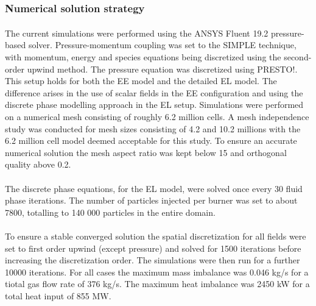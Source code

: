 \documentclass{webofc}
\begin{document}
\subsubsection{Numerical solution strategy}
The current simulations were performed using the ANSYS Fluent\textsuperscript{\textregistered} 19.2 pressure-based solver. Pressure-momentum coupling was set to the SIMPLE technique, with momentum, energy and species equations being discretized using the second-order upwind method. The pressure equation was discretized using PRESTO!. This setup holds for both the EE model and the detailed EL model. The difference arises in the use of scalar fields in the EE configuration and using the discrete phase modelling approach in the EL setup. Simulations were performed on a numerical mesh consisting of roughly 6.2 million cells. A mesh independence study was conducted for mesh sizes consisting of 4.2 and 10.2 millions with the 6.2 million cell model deemed acceptable for this study. To ensure an accurate numerical solution the mesh aspect ratio was kept below 15 and orthogonal quality above 0.2.\\
\\
The discrete phase equations, for the EL model, were solved once every 30 fluid phase iterations. The number of particles injected per burner was set to about 7800, totalling to 140 000 particles in the entire domain.\\
\\
To ensure a stable converged solution the spatial discretization for all fields were set to first order upwind (except pressure) and solved for 1500 iterations before increasing the discretization order. The simulations were then run for a further 10000 iterations. For all cases the maximum mass imbalance was 0.046 kg/s for a tiotal gas flow rate of 376 kg/s. The maximum heat imbalance was 2450 kW for a total heat input of 855 MW.

\newpage
\end{document}
